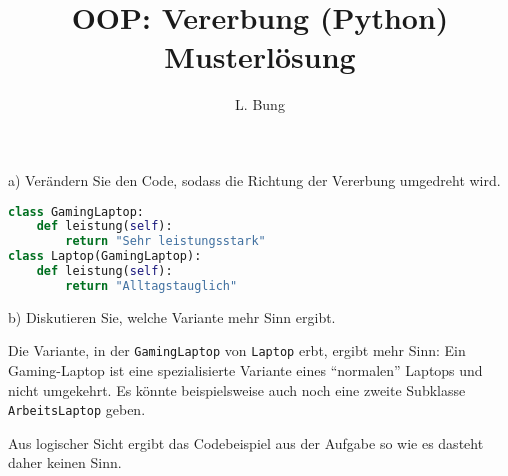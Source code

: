 \documentclass[11pt, a4paper, oneside]{article}
\begin{document}
	\author{L. Bung}
	\title{OOP: Vererbung (Python) \hspace{10cm} Musterlösung}
	\subject{SAE}
	\maketitle
	
	
	
	
	\pagebreak
	

	a) Verändern Sie den Code, sodass die Richtung der Vererbung umgedreht wird.
	
	\begin{lstlisting}[language=python]
class GamingLaptop:
	def leistung(self):
		return "Sehr leistungsstark"
class Laptop(GamingLaptop):
	def leistung(self):
		return "Alltagstauglich"
	\end{lstlisting}
	
	b) Diskutieren Sie, welche Variante mehr Sinn ergibt.
	
	Die Variante, in der \texttt{GamingLaptop} von \texttt{Laptop} erbt, ergibt mehr Sinn:
	Ein Gaming-Laptop ist eine spezialisierte Variante eines ``normalen'' Laptops und nicht umgekehrt.
	Es könnte beispielsweise auch noch eine zweite Subklasse \texttt{ArbeitsLaptop} geben.
	
	Aus logischer Sicht ergibt das Codebeispiel aus der Aufgabe so wie es dasteht daher keinen Sinn.
	
\end{document}
